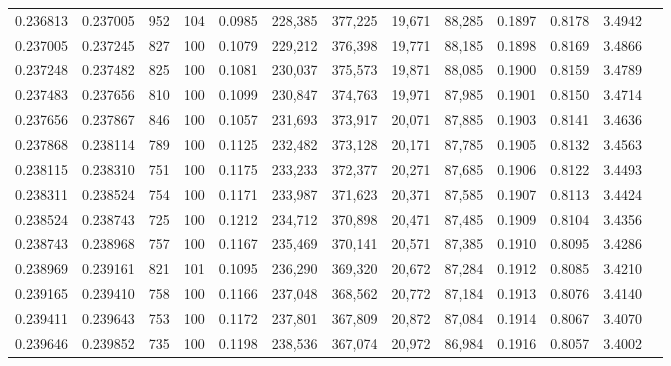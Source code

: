 \begin{tabular}{rrrrrrrrrrrrr}
0.236813 & 0.237005 &   952 & 104 &                                     0.0985 & 228,385 & 377,225 &  19,671 &  88,285 & 0.1897 & 0.8178 & 3.4942 \\
0.237005 & 0.237245 &   827 & 100 &                                     0.1079 & 229,212 & 376,398 &  19,771 &  88,185 & 0.1898 & 0.8169 & 3.4866 \\
0.237248 & 0.237482 &   825 & 100 &                                     0.1081 & 230,037 & 375,573 &  19,871 &  88,085 & 0.1900 & 0.8159 & 3.4789 \\
0.237483 & 0.237656 &   810 & 100 &                                     0.1099 & 230,847 & 374,763 &  19,971 &  87,985 & 0.1901 & 0.8150 & 3.4714 \\
0.237656 & 0.237867 &   846 & 100 &                                     0.1057 & 231,693 & 373,917 &  20,071 &  87,885 & 0.1903 & 0.8141 & 3.4636 \\
0.237868 & 0.238114 &   789 & 100 &                                     0.1125 & 232,482 & 373,128 &  20,171 &  87,785 & 0.1905 & 0.8132 & 3.4563 \\
0.238115 & 0.238310 &   751 & 100 &                                     0.1175 & 233,233 & 372,377 &  20,271 &  87,685 & 0.1906 & 0.8122 & 3.4493 \\
0.238311 & 0.238524 &   754 & 100 &                                     0.1171 & 233,987 & 371,623 &  20,371 &  87,585 & 0.1907 & 0.8113 & 3.4424 \\
0.238524 & 0.238743 &   725 & 100 &                                     0.1212 & 234,712 & 370,898 &  20,471 &  87,485 & 0.1909 & 0.8104 & 3.4356 \\
0.238743 & 0.238968 &   757 & 100 &                                     0.1167 & 235,469 & 370,141 &  20,571 &  87,385 & 0.1910 & 0.8095 & 3.4286 \\
0.238969 & 0.239161 &   821 & 101 &                                     0.1095 & 236,290 & 369,320 &  20,672 &  87,284 & 0.1912 & 0.8085 & 3.4210 \\
0.239165 & 0.239410 &   758 & 100 &                                     0.1166 & 237,048 & 368,562 &  20,772 &  87,184 & 0.1913 & 0.8076 & 3.4140 \\
0.239411 & 0.239643 &   753 & 100 &                                     0.1172 & 237,801 & 367,809 &  20,872 &  87,084 & 0.1914 & 0.8067 & 3.4070 \\
0.239646 & 0.239852 &   735 & 100 &                                     0.1198 & 238,536 & 367,074 &  20,972 &  86,984 & 0.1916 & 0.8057 & 3.4002 \\

\end{tabular}
